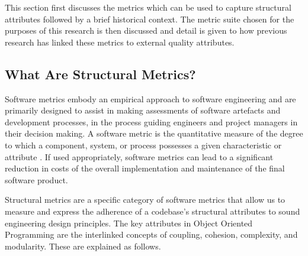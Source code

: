 This section first discusses the metrics which can be used to capture structural attributes followed by a brief historical context. The metric suite chosen for the purposes of this research is then discussed and detail is given to how previous research has linked these metrics to external quality attributes.

\subsection{What Are Structural Metrics?}
Software metrics embody an empirical approach to software engineering and are primarily designed to assist in making assessments of software artefacts and development processes, in the process guiding engineers and project managers in their decision making. A software metric is the quantitative measure of the degree to which a component, system, or process possesses a given characteristic or attribute \cite{ordonez2008state}. If used appropriately, software metrics can lead to a significant reduction in costs of the overall implementation and maintenance of the final software product. 

Structural metrics are a specific category of software metrics that allow us to measure and express the adherence of a codebase's structural attributes to sound engineering design principles. The key attributes in Object Oriented Programming are the interlinked concepts of coupling, cohesion, complexity, and modularity. These are explained as follows.

